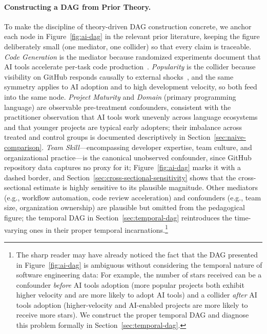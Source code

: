\paragraph{Constructing a DAG from Prior Theory.}
To make the discipline of theory-driven DAG construction concrete, we anchor each node in Figure~\ref{fig:ai-dag} in the relevant prior literature, keeping the figure deliberately small (one mediator, one collider) so that every claim is traceable.
\emph{Code Generation} is the mediator because randomized experiments document that AI tools accelerate per-task code production~\cite{cui2025effects, peng2023impact, DBLP:conf/icse-seip/ParadisGMNMMZFC25}.
\emph{Popularity} is the collider because visibility on GitHub responds causally to external shocks~\cite{DBLP:conf/icse/FangLHV22}, and the same symmetry applies to AI adoption and to high development velocity, so both feed into the same node.
\emph{Project Maturity} and \emph{Domain} (primary programming language) are observable pre-treatment confounders, consistent with the practitioner observation that AI tools work unevenly across language ecosystems and that younger projects are typical early adopters; their imbalance across treated and control groups is documented descriptively in Section~\ref{sec:naive-comparison}.
\emph{Team Skill}---encompassing developer expertise, team culture, and organizational practice---is the canonical unobserved confounder, since GitHub repository data captures no proxy for it; Figure~\ref{fig:ai-dag} marks it with a dashed border, and Section~\ref{sec:cross-sectional-sensitivity} shows that the cross-sectional estimate is highly sensitive to its plausible magnitude.
Other mediators (e.g., workflow automation, code review acceleration) and confounders (e.g., team size, organization ownership) are plausible but omitted from the pedagogical figure; the temporal DAG in Section~\ref{sec:temporal-dag} reintroduces the time-varying ones in their proper temporal incarnations.\footnote{The sharp reader may have already noticed the fact that the DAG presented in Figure~\ref{fig:ai-dag} is ambiguous without considering the temporal nature of software engineering data: For example, the number of stars received can be a confounder \emph{before} AI tools adoption (more popular projects both exhibit higher velocity and are more likely to adopt AI tools) and a collider \emph{after} AI tools adoption (higher-velocity and AI-enabled projects are more likely to receive more stars).
We construct the proper temporal DAG and diagnose this problem formally in Section~\ref{sec:temporal-dag}.}

